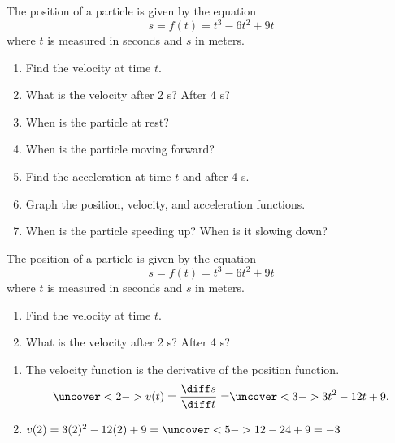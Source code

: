 \begin{frame}[t]
\begin{example}[Example 1, p. 171]
The position of a particle is given by the equation
\abovedisplayskip=0pt
\belowdisplayskip=0pt
\[
s = f(t) = t^3 - 6t^2 + 9t
\]
where $t$ is measured in seconds and $s$ in meters.
\begin{enumerate}
\item  Find the velocity at time $t$.
\item  What is the velocity after 2 s? After 4 s?
\item  When is the particle at rest?
\item  When is the particle moving forward? 
\item  Find the acceleration at time $t$ and after 4 s.
\item  Graph the position, velocity, and acceleration functions.
\item  When is the particle speeding up?  When is it slowing down?
\end{enumerate}
\end{example}
\end{frame}


\begin{frame}[t]
\begin{example}[Example 1, p. 171]
The position of a particle is given by the equation
\abovedisplayskip=0pt
\belowdisplayskip=0pt
\[
s = f(t) = t^3 - 6t^2 + 9t
\]
where $t$ is measured in seconds and $s$ in meters.
\begin{enumerate}
\item<1-| alert@2-3>  Find the velocity at time $t$.
\item<1-| alert@4->  What is the velocity after 2 s? After 4 s?
\end{enumerate}
\begin{enumerate}
\item<2->  The velocity function is the derivative of the position function.
\[
\uncover<2->{%
v(t) = \frac{\diff s}{\diff t} =%
}%
\uncover<3->{%
3t^2 - 12 t + 9.
}%
\]
\item<4->  \alert<handout:0| 4-5>{$v(2) = 3(2)^2 - 12(2) + 9 = \uncover<5->{12-24+9 = -3}$ }  
\end{enumerate}
\end{example}
\end{frame}


